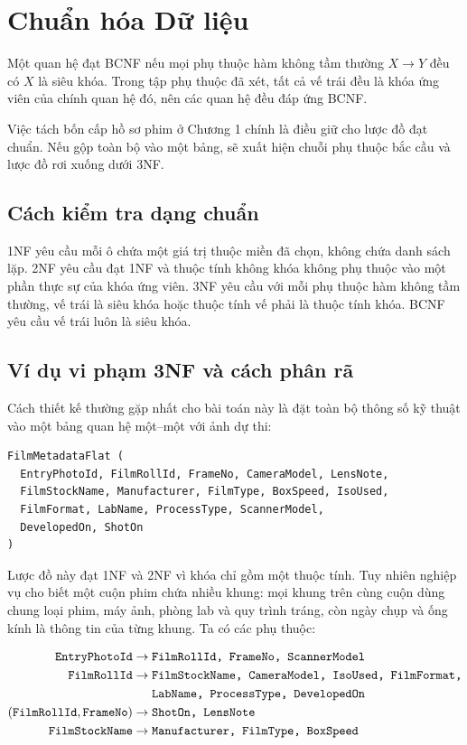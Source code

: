 \section{Chuẩn hóa Dữ liệu}

Một quan hệ đạt BCNF nếu mọi phụ thuộc hàm không tầm thường $X \rightarrow Y$ đều có $X$ là siêu khóa. Trong tập phụ thuộc đã xét, tất cả vế trái đều là khóa ứng viên của chính quan hệ đó, nên các quan hệ đều đáp ứng BCNF.

Việc tách bốn cấp hồ sơ phim ở Chương 1 chính là điều giữ cho lược đồ đạt chuẩn. Nếu gộp toàn bộ vào một bảng, sẽ xuất hiện chuỗi phụ thuộc bắc cầu và lược đồ rơi xuống dưới 3NF.

\subsection{Cách kiểm tra dạng chuẩn}

1NF yêu cầu mỗi ô chứa một giá trị thuộc miền đã chọn, không chứa danh sách lặp. 2NF yêu cầu đạt 1NF và thuộc tính không khóa không phụ thuộc vào một phần thực sự của khóa ứng viên. 3NF yêu cầu với mỗi phụ thuộc hàm không tầm thường, vế trái là siêu khóa hoặc thuộc tính vế phải là thuộc tính khóa. BCNF yêu cầu vế trái luôn là siêu khóa.

\subsection{Ví dụ vi phạm 3NF và cách phân rã}

Cách thiết kế thường gặp nhất cho bài toán này là đặt toàn bộ thông số kỹ thuật vào một bảng quan hệ một--một với ảnh dự thi:


\begin{lstlisting}[style=sqlstyle]
FilmMetadataFlat (
  EntryPhotoId, FilmRollId, FrameNo, CameraModel, LensNote,
  FilmStockName, Manufacturer, FilmType, BoxSpeed, IsoUsed,
  FilmFormat, LabName, ProcessType, ScannerModel,
  DevelopedOn, ShotOn
)
\end{lstlisting}


Lược đồ này đạt 1NF và 2NF vì khóa chỉ gồm một thuộc tính. Tuy nhiên nghiệp vụ cho biết một cuộn phim chứa nhiều khung: mọi khung trên cùng cuộn dùng chung loại phim, máy ảnh, phòng lab và quy trình tráng, còn ngày chụp và ống kính là thông tin của từng khung. Ta có các phụ thuộc:

{\small\begin{align*}
\texttt{EntryPhotoId} &\rightarrow \texttt{FilmRollId, FrameNo, ScannerModel} \\
\texttt{FilmRollId} &\rightarrow \texttt{FilmStockName, CameraModel, IsoUsed, FilmFormat,} \\
&\hphantom{{}\rightarrow{}} \texttt{LabName, ProcessType, DevelopedOn} \\
(\texttt{FilmRollId}, \texttt{FrameNo}) &\rightarrow \texttt{ShotOn, LensNote} \\
\texttt{FilmStockName} &\rightarrow \texttt{Manufacturer, FilmType, BoxSpeed}
\end{align*}}

